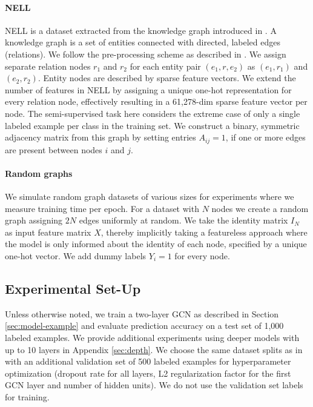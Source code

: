 \documentclass{article} %
\begin{document}
\paragraph{NELL} NELL is a dataset extracted from the knowledge graph introduced in \citep{carlson2010toward}. A knowledge graph is a set of entities connected with directed, labeled edges (relations). We follow the pre-processing scheme as described in \cite{yang2016revisiting}. We assign separate relation nodes $r_1$ and $r_2$ for each entity pair $(e_1, r, e_2)$ as $(e_1, r_1)$ and $(e_2, r_2)$. Entity nodes are described by sparse feature vectors. We extend the number of features in NELL by assigning a unique one-hot representation for every relation node, effectively resulting in a 61,278-dim sparse feature vector per node. The semi-supervised task here considers the extreme case of only a single labeled example per class in the training set. We construct a binary, symmetric adjacency matrix from this graph by setting entries $A_{ij}=1$, if one or more edges are present between nodes $i$ and $j$.

\paragraph{Random graphs} We simulate random graph datasets of various sizes for experiments where we measure training time per epoch. For a dataset with $N$ nodes we create a random graph assigning $2N$ edges uniformly at random. We take the identity matrix $I_N$ as input feature matrix $X$, thereby implicitly taking a featureless approach where the model is only informed about the identity of each node, specified by a unique one-hot vector. We add dummy labels $Y_i = 1$ for every node.

\subsection{Experimental Set-Up}
Unless otherwise noted, we train a two-layer GCN as described in Section \ref{sec:model-example} and evaluate prediction accuracy on a test set of 1,000 labeled examples. We provide additional experiments using deeper models with up to 10 layers in Appendix \ref{sec:depth}. We choose the same dataset splits as in \cite{yang2016revisiting} with an additional validation set of 500 labeled examples for hyperparameter optimization (dropout rate for all layers, L2 regularization factor for the first GCN layer and number of hidden units). We do not use the validation set labels for training.
\end{document}
